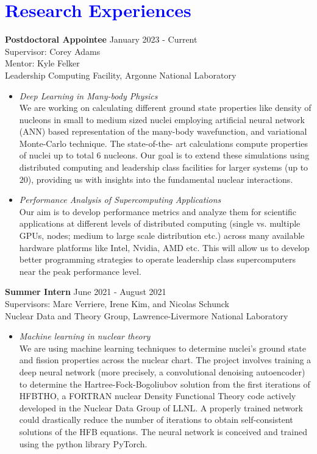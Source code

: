 \documentclass[10pt,fleqn]{scrartcl}
\begin{document}
\section*{\textcolor{blue}{Research Experiences}}
\noindent
\textbf{Postdoctoral Appointee} \hfill{January 2023 - Current}\\
Supervisor: Corey Adams \\
Mentor: Kyle Felker \\
Leadership Computing Facility, Argonne National Laboratory
\begin{itemize}
\item \textit{Deep Learning in Many-body Physics}\\
    We are working on calculating different ground state properties like 
        density of nucleons in small to medium sized nuclei employing 
        artificial neural network (ANN) based representation of the many-body
        wavefunction, and variational Monte-Carlo technique. The state-of-the-
        art calculations compute properties of nuclei up to total $6$ nucleons.
        Our goal is to extend these simulations using distributed computing and
        leadership class facilities for larger systems (up to $20$), providing
        us with insights into the fundamental nuclear interactions. 

\item \textit{Performance Analysis of Supercomputing Applications} \\
    Our aim is to develop performance metrics and analyze them for scientific
        applications at different levels of distributed computing (single vs. 
        multiple GPUs, nodes; medium to large scale distribution etc.) 
        across many available hardware platforms like Intel, Nvidia, AMD etc. 
        This will allow us to develop better programming strategies to operate
        leadership class supercomputers near the peak performance level.
\end{itemize}
\noindent
\textbf{Summer Intern} \hfill June 2021 - August 2021\\
Supervisors: Marc Verriere, Irene Kim, and Nicolas Schunck\\
Nuclear Data and Theory Group, Lawrence-Livermore National Laboratory
\begin{itemize}
\item \textit{Machine learning in nuclear theory}\\
    We are using machine learning techniques to determine nuclei's ground state 
    and fission properties across the nuclear chart. The project involves 
    training a deep neural network (more precisely, a convolutional denoising 
    autoencoder) to determine the Hartree-Fock-Bogoliubov solution from the 
    first iterations of HFBTHO, a FORTRAN nuclear Density Functional Theory 
    code actively developed in the Nuclear Data Group of LLNL. A properly 
    trained network could drastically reduce the number of iterations to obtain 
    self-consistent solutions of the HFB equations. The neural network is 
    conceived and trained using the python library PyTorch.    
\end{itemize}
\end{document}
